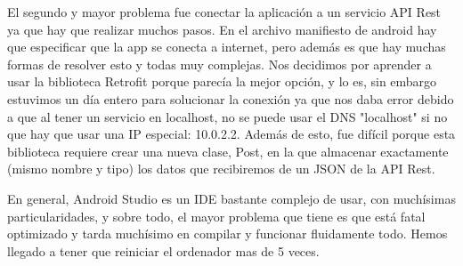 \documentclass[11pt, spanish]{article}
\begin{document}
El segundo y mayor problema fue conectar la aplicación a un servicio API Rest ya que hay que realizar muchos pasos. En el archivo manifiesto de android hay que especificar que la app se conecta a internet, pero además es que hay muchas formas de resolver esto y todas muy complejas. Nos decidimos por aprender a usar la biblioteca Retrofit porque parecía la mejor opción, y lo es, sin embargo estuvimos un día entero para solucionar la conexión ya que nos daba error debido a que al tener un servicio en localhost, no se puede usar el DNS "localhost" si no que hay que usar una IP especial: 10.0.2.2. Además de esto, fue difícil porque esta biblioteca requiere crear una nueva clase, Post, en la que almacenar exactamente (mismo nombre y tipo) los datos que recibiremos de un JSON de la API Rest.

En general, Android Studio es un IDE bastante complejo de usar, con muchísimas particularidades, y sobre todo, el mayor problema que tiene es que está fatal optimizado y tarda muchísimo en compilar y funcionar fluidamente todo. Hemos llegado a tener que reiniciar el ordenador mas de 5 veces.
\end{document}
